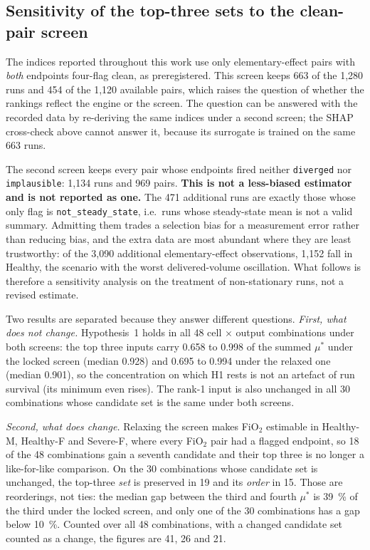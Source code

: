 \documentclass[pdflatex,sn-nature]{sn-jnl}%
\begin{document}
\subsection{Sensitivity of the top-three sets to the clean-pair screen}\label{sec:s13-screen}

The indices reported throughout this work use only elementary-effect pairs with \emph{both} endpoints four-flag clean, as preregistered. This screen keeps 663 of the 1{,}280 runs and 454 of the 1{,}120 available pairs, which raises the question of whether the rankings reflect the engine or the screen. The question can be answered with the recorded data by re-deriving the same indices under a second screen; the SHAP cross-check above cannot answer it, because its surrogate is trained on the same 663 runs.

The second screen keeps every pair whose endpoints fired neither \texttt{diverged} nor \texttt{implausible}: 1{,}134 runs and 969 pairs. \textbf{This is not a less-biased estimator and is not reported as one.} The 471 additional runs are exactly those whose only flag is \texttt{not\_steady\_state}, i.e.\ runs whose steady-state mean is not a valid summary. Admitting them trades a selection bias for a measurement error rather than reducing bias, and the extra data are most abundant where they are least trustworthy: of the 3{,}090 additional elementary-effect observations, 1{,}152 fall in Healthy, the scenario with the worst delivered-volume oscillation. What follows is therefore a sensitivity analysis on the treatment of non-stationary runs, not a revised estimate.

Two results are separated because they answer different questions. \emph{First, what does not change.} Hypothesis~1 holds in all 48 cell $\times$ output combinations under both screens: the top three inputs carry 0.658 to 0.998 of the summed $\mu^{*}$ under the locked screen (median 0.928) and 0.695 to 0.994 under the relaxed one (median 0.901), so the concentration on which H1 rests is not an artefact of run survival (its minimum even rises). The rank-1 input is also unchanged in all 30 combinations whose candidate set is the same under both screens.

\emph{Second, what does change.} Relaxing the screen makes FiO$_2$ estimable in Healthy-M, Healthy-F and Severe-F, where every FiO$_2$ pair had a flagged endpoint, so 18 of the 48 combinations gain a seventh candidate and their top three is no longer a like-for-like comparison. On the 30 combinations whose candidate set is unchanged, the top-three \emph{set} is preserved in 19 and its \emph{order} in 15. Those are reorderings, not ties: the median gap between the third and fourth $\mu^{*}$ is 39~\% of the third under the locked screen, and only one of the 30 combinations has a gap below 10~\%. Counted over all 48 combinations, with a changed candidate set counted as a change, the figures are 41, 26 and 21.
\end{document}
